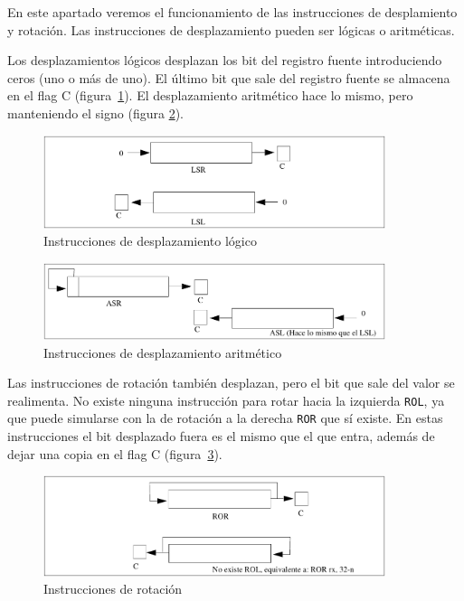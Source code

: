 En este apartado veremos el funcionamiento de las instrucciones de
desplamiento y rotación. Las instrucciones de desplazamiento pueden
ser lógicas o aritméticas.

Los desplazamientos lógicos desplazan los bit del registro fuente
introduciendo ceros (uno o más de uno). El último bit que sale del registro
fuente se almacena en el flag C (figura~\ref{fig:instrSHIFT}).
El desplazamiento aritmético hace lo mismo, pero manteniendo el signo
(figura \ref{fig:instrSHIFTarit}).

\begin{figure}[h]
  \centering
    \includegraphics[width=10cm]{graphs/lsrlsl.pdf}
  \caption{Instrucciones de desplazamiento lógico}
  \label{fig:instrSHIFT}
\end{figure}

\begin{figure}[h]
  \centering
    \includegraphics[width=10cm]{graphs/asrasl.pdf}
  \caption{Instrucciones de desplazamiento aritmético}
  \label{fig:instrSHIFTarit}
\end{figure}

Las instrucciones de rotación también desplazan, pero el bit que sale del
valor se realimenta. No existe ninguna instrucción para rotar hacia la
izquierda {\tt ROL}, ya que puede simularse con la de rotación a la derecha
{\tt ROR} que sí existe. En estas instrucciones el bit desplazado fuera
es el mismo que el que entra, además de dejar una copia
en el flag C (figura~\ref{fig:instrRotacion}).

\begin{figure}[h]
  \centering
    \includegraphics[width=10cm]{graphs/rorrol.pdf}
  \caption{Instrucciones de rotación}
  \label{fig:instrRotacion}
\end{figure}

